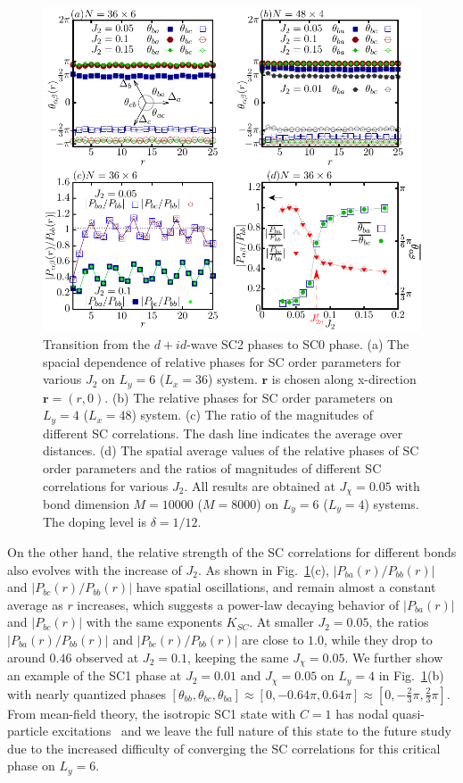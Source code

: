 \documentclass[aps,prx,reprint,superscriptaddress,showpacs]{revtex4-2}
\begin{document}
\begin{figure}
\centering
\includegraphics[width=1\linewidth]{Phase_transition_v4.pdf}
\caption{Transition from the $d+id$-wave SC2 phases to SC0 phase. (a) The spacial dependence of relative phases for SC  order parameters for various $J_{2}$ on $L_{y}=6$ ($L_{x}=36$) system. $\mathbf{r}$ is chosen along x-direction $\mathbf{r}=(r,0)$.  (b) The relative phases for SC order parameters on $L_{y}=4$ ($L_{x}=48$) system.  (c) The ratio of the magnitudes of different SC  correlations. The dash line indicates the average over distances. (d) The spatial average values of the relative phases of SC order parameters and the ratios of  magnitudes of different SC correlations for various $J_{2}$. All results are obtained at $J_{\chi }=0.05$ with bond dimension $M=10000$ ($M=8000$) on $L_{y}=6$ ($L_{y}=4$) systems. The doping level is $\delta=1/12$.}
\label{Fig_phase_transition}
\end{figure}

On the other hand,  the relative strength of the SC correlations for different bonds also evolves with the increase of $J_{2}$. As shown in Fig.~\ref{Fig_phase_transition}(c), $|P_{ba}(r)/P_{bb}(r)|$ and $|P_{bc}(r)/P_{bb}(r)|$ have spatial oscillations, and  remain almost a constant average as $r$ increases, which suggests a power-law decaying behavior of $\left | P_{ba}(r) \right |$ and $\left | P_{bc}(r) \right |$ with the same exponents  $K_{SC}$. At smaller $J_{2}=0.05$, the ratios $|P_{ba}(r)/P_{bb}(r)|$ and $|P_{bc}(r)/P_{bb}(r)|$ are close to $1.0$, while they drop to around $0.46$  observed at $J_{2}=0.1$, keeping the same $J_{\chi}=0.05$.
 We further show an example of the SC1 phase at  $J_{2}=0.01$  and $J_{\chi}=0.05$ on $L_{y}=4$ in Fig.~\ref{Fig_phase_transition}(b) with nearly quantized phases $[{\theta }_{bb },{\theta }_{bc},{\theta }_{ba}]\approx [0,-0.64\pi, 0.64\pi]\approx [0,-\frac{2}{3}\pi,\frac{2}{3}\pi]$.   From mean-field theory, the isotropic SC1 state with $C=1$ has nodal quasi-particle excitations~\cite{zhou2008nodal} and   we leave the full nature of this state to the future study due to the increased  difficulty of  converging the SC correlations for this critical phase on $L_{y}=6$.
\end{document}
